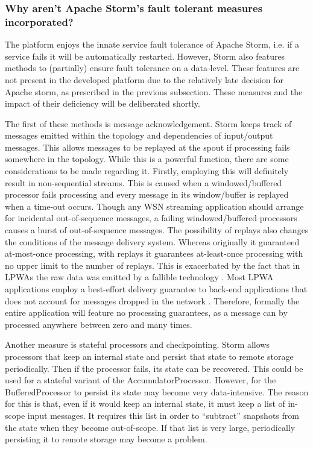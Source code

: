 \subsubsection{Why aren't Apache Storm's fault tolerant measures incorporated?}
The platform enjoys the innate service fault tolerance of Apache Storm, i.e. if a service fails it will be automatically restarted. However, Storm also features methods to (partially) ensure fault tolerance on a data-level. These features are not present in the developed platform due to the relatively late decision for Apache storm, as prescribed in the previous subsection. These measures and the impact of their deficiency will be deliberated shortly.

The first of these methods is message acknowledgement. Storm keeps track of messages emitted within the topology and dependencies of input/output messages. This allows messages to be replayed at the spout if processing fails somewhere in the topology. While this is a powerful function, there are some considerations to be made regarding it. Firstly, employing this will definitely result in non-sequential streams. This is caused when a windowed/buffered processor fails processing and every message in its window/buffer is replayed when a time-out occurs. Though any WSN streaming application should arrange for incidental out-of-sequence messages, a failing windowed/buffered processors causes a burst of out-of-sequence messages. The possibility of replays also changes the conditions of the message delivery system. Whereas originally it guaranteed at-most-once processing, with replays it guarantees at-least-once processing with no upper limit to the number of replays. This is exacerbated by the fact that in LPWAs the raw data was emitted by a fallible technology \cite{ontology}. Most LPWA applications employ a best-effort delivery guarantee to back-end applications that does not account for messages dropped in the network \cite{stream_requirements}. Therefore, formally the entire application will feature no processing guarantees, as a message can by processed anywhere between zero and many times.

Another measure is stateful processors and checkpointing. Storm allows processors that keep an internal state and persist that state to remote storage periodically. Then if the processor fails, its state can be recovered. This could be used for a stateful variant of the AccumulatorProcessor. However, for the BufferedProcessor to persist its state may become very data-intensive. The reason for this is that, even if it would keep an internal state, it must keep a list of in-scope input messages. It requires this list in order to ``subtract'' snapshots from the state when they become out-of-scope. If that list is very large, periodically persisting it to remote storage may become a problem.

